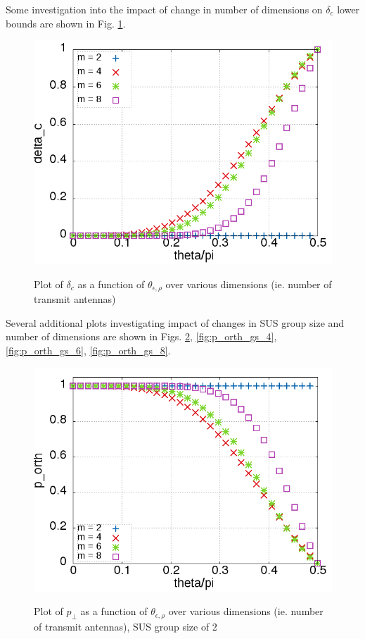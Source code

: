 Some investigation into the impact of change in number of dimensions on $\delta_c$ lower bounds are shown in Fig. \ref{fig:delta}.
\begin{figure}
    \includegraphics[width=12cm]{figs/delta.png}\\
    \caption{Plot of $\delta_c$ as a function of $\theta_{\epsilon,\rho}$ over various dimensions (ie. number of transmit antennas)}
    \label{fig:delta}
\end{figure}

Several additional plots investigating impact of changes in SUS group size and number of dimensions are shown in Figs. \ref{fig:p_orth_gs_2}, \ref{fig:p_orth_gs_4}, \ref{fig:p_orth_gs_6}, \ref{fig:p_orth_gs_8}.

\begin{figure}
    \includegraphics[width=12cm]{figs/p_orth_gs_2.png}\\
    \caption{Plot of $p_{\perp}$ as a function of $\theta_{\epsilon,\rho}$ over various dimensions (ie. number of transmit antennas), SUS group size of 2}
    \label{fig:p_orth_gs_2}
\end{figure}

